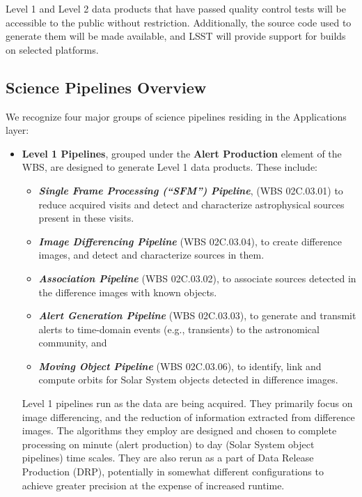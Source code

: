 \documentclass[12pt]{article}
\newcommand{\wbsSFM}{WBS 02C.03.01}
\newcommand{\wbsAssocP}{WBS 02C.03.02}
\newcommand{\wbsAP}{WBS 02C.03.03}
\newcommand{\wbsDiffim}{WBS 02C.03.04}
\newcommand{\wbsMOPS}{WBS 02C.03.06}
\begin{document}
Level 1 and Level 2 data products that have passed quality control
tests will be accessible to the public without restriction.
Additionally, the source code used to generate them will be made
available, and LSST will provide support for builds on selected
platforms.

\subsection{Science Pipelines Overview}

We recognize four major groups of science pipelines residing in the Applications layer:
\begin{itemize}
    \item {\bf Level 1 Pipelines}, grouped under the {\bf Alert Production} element of the WBS, are designed to generate Level 1 data products. These include:
    \begin{itemize}
    \item {\bf \em Single Frame Processing (``SFM'') Pipeline}, (\wbsSFM) to reduce acquired visits and detect and characterize astrophysical sources present in these visits.
    \item {\bf \em Image Differencing Pipeline} (\wbsDiffim), to create difference images, and detect and characterize sources in them.
    \item {\bf \em Association Pipeline} (\wbsAssocP), to associate sources detected in the difference images with known objects.
    \item {\bf \em Alert Generation Pipeline} (\wbsAP), to generate and transmit alerts to time-domain events (e.g., transients) to the astronomical community, and
    \item {\bf \em Moving Object Pipeline} (\wbsMOPS), to identify, link and compute orbits for Solar System objects detected in difference images.
    \end{itemize}
Level 1 pipelines run as the data are being acquired. They primarily focus on image differencing, and the reduction of information extracted from difference images. The algorithms they employ are designed and chosen to complete processing on minute (alert production) to day (Solar System object pipelines) time scales. They are also rerun as a part of Data Release Production (DRP), potentially in somewhat different configurations to achieve greater precision at the expense of increased runtime.
    

\end{itemize}
\end{document}

